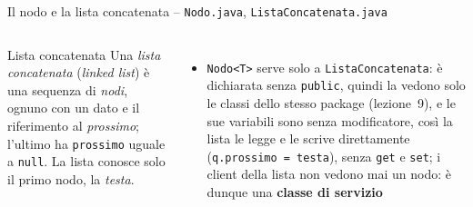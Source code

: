 \documentclass[10pt,aspectratio=169,xcolor={table}]{beamer}
\begin{document}
\begin{frame}[fragile]{Il nodo e la lista concatenata -- \texttt{Nodo.java}, \texttt{ListaConcatenata.java}}
\begin{columns}[T]
\begin{block}{Lista concatenata}
\small Una \emph{lista concatenata} (\emph{linked list}) è una sequenza di \emph{nodi}, ognuno con un dato e il riferimento al \emph{prossimo}; l'ultimo ha \texttt{prossimo} uguale a \texttt{null}. La lista conosce solo il primo nodo, la \emph{testa}.
\end{block}
\vspace{-0.35cm}
\footnotesize
\begin{itemize}\itemsep=3pt
    \item \texttt{Nodo<T>} serve solo a \texttt{ListaConcatenata}: è dichiarata senza \texttt{public}, quindi la vedono solo le classi dello stesso package (lezione~9), e le sue variabili sono senza modificatore, così la lista le legge e le scrive direttamente (\texttt{q.prossimo = testa}), senza \texttt{get} e \texttt{set}; i client della lista non vedono mai un nodo: è dunque una \textbf{classe di servizio}
\end{itemize}
\end{columns}
\end{frame}
\end{document}
